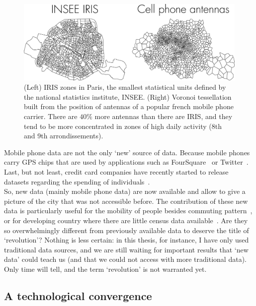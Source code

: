 \begin{figure}
    \centering
    \includegraphics[width=\textwidth]{gfx/chapter-intro/IRIS_phone.pdf}
    \caption{(Left) IRIS zones in Paris, the smallest statistical units defined
    by the national statistics institute, INSEE. (Right) Voronoi tessellation
    built from the position of antennas of a popular french mobile phone carrier.
    There are $40\%$ more antennas than there are IRIS, and they tend to be more
    concentrated in zones of high daily activity (8th and 9th
    arrondissements).\label{fig:IRIS_phone}}
\end{figure}

Mobile phone data are not the only `new' source of data. Because mobile phones carry
GPS chips that are used by applications such as
FourSquare~\cite{Noulas:2012} or Twitter~\cite{Lenormand:2014_tweets}. Last, but
not least, credit card companies have recently started to release datasets
regarding the spending of individuals~\cite{Lenormand:2015}.\\

So, new data (mainly mobile phone data) are now available and allow to give a
picture of the city that was not accessible before. The contribution of these new
data is particularly useful for the mobility of people besides commuting
pattern~\cite{Louail:2014}, or for developing country where there are little
census data available~\cite{Blondel:2012}. Are they so overwhelmingly different
from previously available data to deserve the title of `revolution'? Nothing is
less certain: in this thesis, for instance, I have only used traditional data
sources, and we are still waiting for important results that `new data' could teach
us (and that we could not access with more traditional data). Only time will tell,
and the term `revolution' is not warranted yet.



\subsection{A technological convergence}
\label{sub:a_technological_convergence} 


